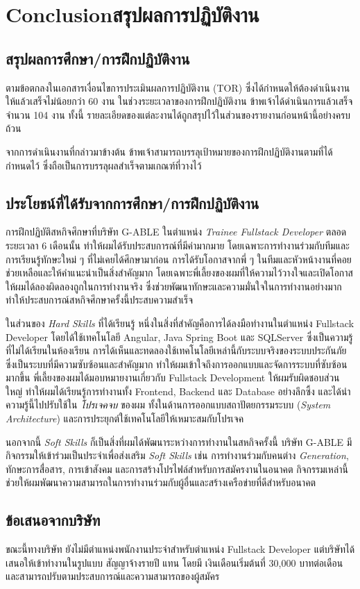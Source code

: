 \chapter{\ifenglish Conclusion\else สรุปผลการปฏิบัติงาน\fi}

\section{สรุปผลการศึกษา/การฝึกปฏิบัติงาน} ตามข้อตกลงในเอกสารเงื่อนไขการประเมินผลการปฏิบัติงาน (TOR) ซึ่งได้กำหนดให้ต้องดำเนินงานให้แล้วเสร็จไม่น้อยกว่า 60 งาน ในช่วงระยะเวลาของการฝึกปฏิบัติงาน ข้าพเจ้าได้ดำเนินการแล้วเสร็จจำนวน 104 งาน ทั้งนี้ รายละเอียดของแต่ละงานได้ถูกสรุปไว้ในส่วนของรายงานก่อนหน้านี้อย่างครบถ้วน

จากการดำเนินงานที่กล่าวมาข้างต้น ข้าพเจ้าสามารถบรรลุเป้าหมายของการฝึกปฏิบัติงานตามที่ได้กำหนดไว้ ซึ่งถือเป็นการบรรลุผลสำเร็จตามเกณฑ์ที่วางไว้

\section{ประโยชน์ที่ได้รับจากการศึกษา/การฝึกปฏิบัติงาน}
การฝึกปฏิบัติสหกิจศึกษาที่บริษัท G-ABLE ในตำแหน่ง \textit{Trainee Fullstack Developer} ตลอดระยะเวลา 6 เดือนนั้น ทำให้ผมได้รับประสบการณ์ที่มีค่ามากมาย โดยเฉพาะการทำงานร่วมกับทีมและการเรียนรู้ทักษะใหม่ ๆ ที่ไม่เคยได้ศึกษามาก่อน การได้รับโอกาสจากพี่ ๆ ในทีมและหัวหน้างานที่คอยช่วยเหลือและให้คำแนะนำเป็นสิ่งสำคัญมาก โดยเฉพาะพี่เลี้ยงของผมที่ให้ความไว้วางใจและเปิดโอกาสให้ผมได้ลองผิดลองถูกในการทำงานจริง ซึ่งช่วยพัฒนาทักษะและความมั่นใจในการทำงานอย่างมาก ทำให้ประสบการณ์สหกิจศึกษาครั้งนี้ประสบความสำเร็จ

ในส่วนของ \textit{Hard Skills} ที่ได้เรียนรู้ หนึ่งในสิ่งที่สำคัญคือการได้ลงมือทำงานในตำแหน่ง Fullstack Developer โดยได้ใช้เทคโนโลยี Angular, Java Spring Boot และ SQLServer ซึ่งเป็นความรู้ที่ไม่ได้เรียนในห้องเรียน การได้เห็นและทดลองใช้เทคโนโลยีเหล่านี้กับระบบจริงของระบบประกันภัย ซึ่งเป็นระบบที่มีความซับซ้อนและสำคัญมาก ทำให้ผมเข้าใจถึงการออกแบบและจัดการระบบที่ซับซ้อนมากขึ้น พี่เลี้ยงของผมได้มอบหมายงานเกี่ยวกับ Fullstack Development ให้ผมรับผิดชอบส่วนใหญ่ ทำให้ผมได้เรียนรู้การทำงานทั้ง Frontend, Backend และ Database อย่างลึกซึ้ง และได้นำความรู้นี้ไปปรับใช้ใน \textit{โปรเจคจบ} ของผม ทั้งในด้านการออกแบบสถาปัตยกรรมระบบ (\textit{System Architecture}) และการประยุกต์ใช้เทคโนโลยีให้เหมาะสมกับโปรเจค

นอกจากนี้ \textit{Soft Skills} ก็เป็นสิ่งที่ผมได้พัฒนาระหว่างการทำงานในสหกิจครั้งนี้ บริษัท G-ABLE มีกิจกรรมให้เข้าร่วมเป็นประจำเพื่อส่งเสริม \textit{Soft Skills} เช่น การทำงานร่วมกับคนต่าง \textit{Generation}, ทักษะการสื่อสาร, การเข้าสังคม และการสร้างโปรไฟล์สำหรับการสมัครงานในอนาคต กิจกรรมเหล่านี้ช่วยให้ผมพัฒนาความสามารถในการทำงานร่วมกับผู้อื่นและสร้างเครือข่ายที่ดีสำหรับอนาคต

\section{ข้อเสนอจากบริษัท}
ขณะนี้ทางบริษัท ยังไม่มีตำแหน่งพนักงานประจำสำหรับตำแหน่ง Fullstack Developer แต่บริษัทได้เสนอให้เข้าทำงานในรูปแบบ สัญญาจ้างรายปี แทน โดยมี เงินเดือนเริ่มต้นที่ 30,000 บาทต่อเดือน และสามารถปรับตามประสบการณ์และความสามารถของผู้สมัคร